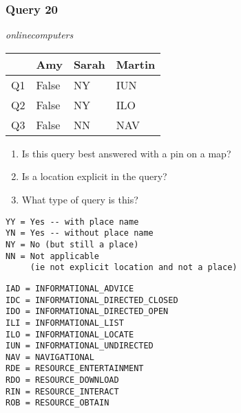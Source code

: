 \begin{frame}[fragile]
\frametitle{Query 20}
\vspace{1em}

\emph{onlinecomputers}

\vfill

\begin{table}
  \centering
  \begin{tabular}{ l l l l }
    & \textbf{Amy} & \textbf{Sarah} & \textbf{Martin}\\
    \toprule
    Q1 & False & NY & IUN\\
Q2 & False & NY & ILO\\
Q3 & False & NN & NAV\\
    \bottomrule
  \end{tabular}
\end{table}

\vfill

\tiny{

\begin{enumerate}
\item Is this query best answered with a pin on a map?
\item Is a location explicit in the query?
\item What type of query is this?
\end{enumerate}

\vfill

\begin{multicols}{2}
\begin{verbatim}
YY = Yes -- with place name
YN = Yes -- without place name
NY = No (but still a place)
NN = Not applicable 
     (ie not explicit location and not a place)
\end{verbatim}

\columnbreak
\begin{verbatim}
IAD = INFORMATIONAL_ADVICE
IDC = INFORMATIONAL_DIRECTED_CLOSED
IDO = INFORMATIONAL_DIRECTED_OPEN
ILI = INFORMATIONAL_LIST
ILO = INFORMATIONAL_LOCATE
IUN = INFORMATIONAL_UNDIRECTED
NAV = NAVIGATIONAL
RDE = RESOURCE_ENTERTAINMENT
RDO = RESOURCE_DOWNLOAD
RIN = RESOURCE_INTERACT
ROB = RESOURCE_OBTAIN
\end{verbatim}
\end{multicols}
}

\end{frame}


